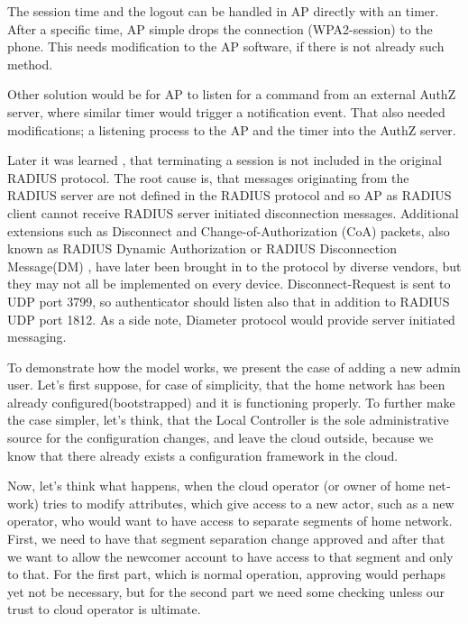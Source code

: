 \documentclass[12pt,a4paper,english]{tutthesis}
\begin{document}
\begin{otherlanguage}{english}
The session time and the logout can be handled in AP directly with
an timer. After a specific time, AP simple drops the connection
(WPA2-session) to the phone. This needs modification to the AP
software, if there is not already such method.

Other solution would be for AP to listen for a command from an external
AuthZ server, where similar timer would trigger a notification event. 
That also needed modifications;  a listening process to the AP and 
the timer into the AuthZ server. 




Later it was learned \cite{rfc2865}, that terminating a session is not
included in the original RADIUS protocol.  The root cause is, that
messages originating from the RADIUS server are not defined in the
RADIUS protocol and so AP as RADIUS client cannot receive RADIUS
server initiated disconnection messages.  Additional extensions such
as Disconnect and Change-of-Authorization (CoA) packets, also known as
RADIUS Dynamic Authorization or RADIUS Disconnection Message(DM) \cite{rfc5176}, have
later been brought in to the protocol by diverse
vendors, but they may not all be implemented on every device.
Disconnect-Request is sent to UDP port 3799, so authenticator should
listen also that in addition to RADIUS UDP port 1812.
As a side note, Diameter protocol would provide server initiated messaging.



To demonstrate how the model works, we present the case of adding a
new admin user. Let's first suppose, for case of simplicity, that the
home network has been already configured(bootstrapped) and it is
functioning properly.  To further make the case simpler, let's think,
that the Local Controller is the sole administrative source for the
configuration changes, and leave the cloud outside, 
because we know that there already exists a configuration framework in the cloud.


Now, let's think what happens, when the cloud operator (or owner of
home network) tries to modify attributes, which give access to a new actor,
such as a new operator, who would want to have access to separate
segments of home network.  First, we need to have that segment separation
change approved and after that we want to allow the newcomer account
to have access to that segment and only to that. For the first part,
which is normal operation, approving would perhaps yet not be
necessary, but for the second part we need some checking unless our
trust to cloud operator is ultimate.  


\end{otherlanguage}
\end{document}
